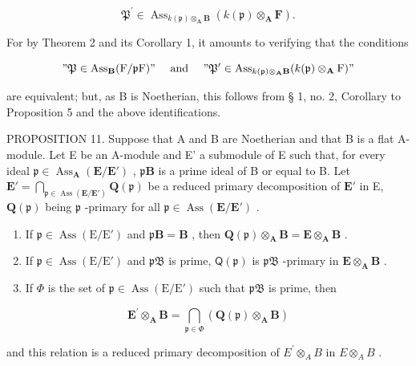 \[
\mathfrak {P} ^ {\prime} \in \operatorname{Ass} _ {k (\mathfrak {p}) \otimes_ {\mathbf {A}} \mathbf {B}} (k (\mathfrak {p}) \otimes_ {\mathbf {A}} \mathbf {F}).
\]

For by Theorem 2 and its Corollary 1, it amounts to verifying that the conditions

\[
" \mathfrak {P} \in \operatorname{Ass} _ {\mathbf {B}} (\mathrm{F} / \mathfrak {p} \mathrm{F})" \quad \text { and } \quad " \mathfrak {P} ^ {\prime} \in \operatorname{Ass} _ {k (\mathfrak {p}) \otimes_ {\mathbf {A}} \mathbf {B}} (k (\mathfrak {p}) \otimes_ {\mathbf {A}} \mathrm{F})"
\]

are equivalent; but, as B is Noetherian, this follows from § 1, no. 2, Corollary to Proposition 5 and the above identifications.

PROPOSITION 11. Suppose that A and B are Noetherian and that B is a flat A-module. Let E be an A-module and E' a submodule of E such that, for every ideal \(\mathfrak{p} \in \operatorname{Ass}_{\mathbf{A}}(\mathbf{E}/\mathbf{E}')\) , \(\mathfrak{p}\mathbf{B}\) is a prime ideal of B or equal to B. Let \(\mathbf{E}' = \bigcap_{\mathfrak{p} \in \operatorname{Ass}(\mathbf{E}/\mathbf{E}')} \mathbf{Q}(\mathfrak{p})\) be a reduced primary decomposition of \(\mathbf{E}'\) in E, \(\mathbf{Q}(\mathfrak{p})\) being \(\mathfrak{p}\) -primary for all \(\mathfrak{p} \in \operatorname{Ass}(\mathbf{E}/\mathbf{E}')\) .

\begin{enumerate}
\def\labelenumi{(\roman{enumi})}
\item
  If \(\mathfrak{p} \in \operatorname{Ass}(\mathrm{E} / \mathrm{E}')\) and \(\mathfrak{p}\mathbf{B} = \mathbf{B}\) , then \(\mathbf{Q}(\mathfrak{p}) \otimes_{\mathbf{A}} \mathbf{B} = \mathbf{E} \otimes_{\mathbf{A}} \mathbf{B}\) .
\item
  If \(\mathfrak{p} \in \operatorname{Ass}(\mathrm{E} / \mathrm{E}')\) and \(\mathfrak{pB}\) is prime, \(\mathsf{Q}(\mathfrak{p})\) is \(\mathfrak{pB}\) -primary in \(\mathbf{E} \otimes_{\mathbf{A}} \mathbf{B}\) .
\item
  If \(\Phi\) is the set of \(\mathfrak{p} \in \operatorname{Ass}(\mathrm{E} / \mathrm{E}')\) such that \(\mathfrak{pB}\) is prime, then
\end{enumerate}

\[
\mathbf {E} ^ {\prime} \otimes_ {\mathbf {A}} \mathbf {B} = \bigcap_ {\mathfrak {p} \in \Phi} (\mathbf {Q} (\mathfrak {p}) \otimes_ {\mathbf {A}} \mathbf {B})
\]

and this relation is a reduced primary decomposition of \(E^{\prime} \otimes_{A} B\) in \(E \otimes_{A} B\) .

